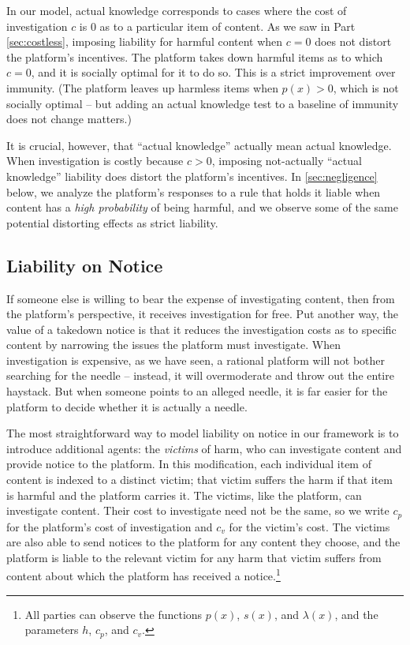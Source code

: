 In our model, actual knowledge corresponds to cases where the cost of investigation $c$ is $0$ as to a particular item of content. As we saw in Part \ref{sec:costless}, imposing liability for harmful content when $c=0$ does not distort the platform's incentives. The platform takes down harmful items as to which $c=0$, and it is socially optimal for it to do so. This is a strict improvement over immunity. (The platform leaves up harmless items when $p(x) > 0$, which is not socially optimal -- but adding an actual knowledge test to a baseline of immunity does not change matters.)

It is crucial, however, that ``actual knowledge'' actually mean actual knowledge. When investigation is costly because $c > 0$, imposing not-actually ``actual knowledge'' liability does distort the platform's incentives. In \ref{sec:negligence} below, we analyze the platform's responses to a rule that holds it liable when content has a \emph{high probability} of being harmful, and we observe some of the same potential distorting effects as strict liability.


\subsection{Liability on Notice}
\label{sec:notice}

If someone else is willing to bear the expense of investigating content, then from the platform's perspective, it receives investigation for free. Put another way, the value of a takedown notice is that it reduces the investigation costs as to specific content by narrowing the issues the platform must investigate. When investigation is expensive, as we have seen, a rational platform will not bother searching for the needle -- instead, it will overmoderate and throw out the entire haystack. But when someone points to an alleged needle, it is far easier for the platform to decide whether it is actually a needle.

The most straightforward way to model liability on notice in our framework is to introduce additional agents: the \emph{victims} of harm, who can investigate content and provide notice to the platform. In this modification, each individual item of content is indexed to a distinct victim; that victim suffers the harm if that item is harmful and the platform carries it. The victims, like the platform, can investigate content.  Their cost to investigate need not be the same, so we write $c_p$ for the platform's cost of investigation and $c_v$ for the victim's cost. The victims are also able to send notices to the platform for any content they choose, and the platform is liable to the relevant victim for any harm that victim suffers from content about which the platform has received a notice.\footnote{All parties can observe the functions $p(x)$, $s(x)$, and $\lambda(x)$, and the parameters $h$, $c_p$, and $c_v$.}


